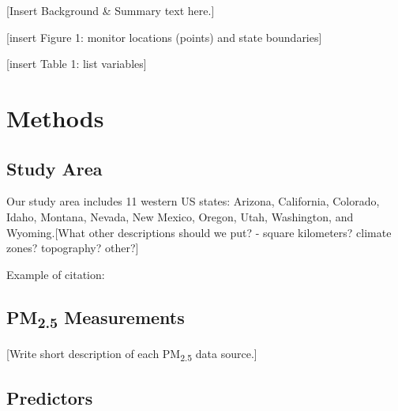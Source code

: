 \documentclass[english]{article}
\begin{document}
[Insert Background \& Summary text here.]

[insert Figure 1:  monitor locations (points) and state boundaries]

[insert Table 1: list variables]


\section*{Methods}


\subsection*{Study Area}

Our study area includes 11 western US states: Arizona, California, Colorado, Idaho, Montana, Nevada, New Mexico, Oregon, Utah, Washington, and Wyoming.[What other descriptions should we put? - square kilometers? climate zones? topography? other?] 

Example of citation: \cite{liu_estimating_2005}

\subsection*{PM\textsubscript{2.5} Measurements}

[Write short description of each PM\textsubscript{2.5} data source.]

\subsection*{Predictors}
\end{document}
